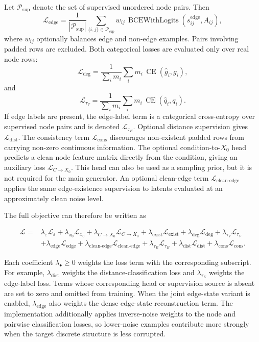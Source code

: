 Let $\mathcal{P}_{\mathrm{sup}}$ denote the set of supervised unordered node
pairs. Then
\[
\mathcal{L}_{\mathrm{edge}}
=
\frac{1}{|\mathcal{P}_{\mathrm{sup}}|}
\sum_{\{i,j\}\in\mathcal{P}_{\mathrm{sup}}}
w_{ij}\,
\operatorname{BCEWithLogits}
\left(
s^{\mathrm{edge}}_{ij},
A_{ij}
\right),
\]
where $w_{ij}$ optionally balances edge and non-edge examples. Pairs involving
padded rows are excluded.
Both categorical losses are evaluated only over real node rows:
\[
\mathcal{L}_{\mathrm{deg}}
=
\frac{1}{\sum_i m_i}
\sum_i
m_i\,
\operatorname{CE}(\hat g_i,g_i),
\]
and
\[
\mathcal{L}_{\tau_V}
=
\frac{1}{\sum_i m_i}
\sum_i
m_i\,
\operatorname{CE}(\hat q_i,q_i).
\]
If edge labels are present, the edge-label term is a categorical
cross-entropy over supervised node pairs and is denoted
\(\mathcal{L}_{\tau_E}\). Optional distance supervision gives
\(\mathcal{L}_{\mathrm{dist}}\). The consistency term
\(\mathcal{L}_{\mathrm{cons}}\) discourages non-existent padded rows from
carrying non-zero continuous information. The optional condition-to-\(X_0\)
head predicts a clean node feature matrix directly from the condition, giving
an auxiliary loss \(\mathcal{L}_{C\rightarrow X_0}\). This head can also be used
as a sampling prior, but it is not required for the main generator. An optional
clean-edge term \(\mathcal{L}_{\mathrm{clean\text{-}edge}}\) applies the same
edge-existence supervision to latents evaluated at an approximately clean noise
level.

The full objective can therefore be written as

\[
\begin{aligned}
    \mathcal{L}
    ={}&
    \lambda_{\varepsilon}\mathcal{L}_{\varepsilon}
    + \lambda_{x_0}\mathcal{L}_{x_0}
    + \lambda_{C\rightarrow X_0}\mathcal{L}_{C\rightarrow X_0}
    + \lambda_{\mathrm{exist}}\mathcal{L}_{\mathrm{exist}}
    + \lambda_{\mathrm{deg}}\mathcal{L}_{\mathrm{deg}}
    + \lambda_{\tau_V}\mathcal{L}_{\tau_V}  \\
    &+
    \lambda_{\mathrm{edge}}\mathcal{L}_{\mathrm{edge}}
    + \lambda_{\mathrm{clean\text{-}edge}}\mathcal{L}_{\mathrm{clean\text{-}edge}}
    + \lambda_{\tau_E}\mathcal{L}_{\tau_E}
    + \lambda_{\mathrm{dist}}\mathcal{L}_{\mathrm{dist}}
    + \lambda_{\mathrm{cons}}\mathcal{L}_{\mathrm{cons}}.
\end{aligned}
\]

Each coefficient \(\lambda_{\bullet}\geq 0\) weights the loss term with the
corresponding subscript. For example, \(\lambda_{\mathrm{dist}}\) weights the
distance-classification loss and \(\lambda_{\tau_E}\) weights the edge-label
loss. Terms whose corresponding head or supervision source is absent are set to
zero and omitted from training. When the joint edge-state variant is enabled,
\(\lambda_{\mathrm{edge}}\) also weights the dense edge-state reconstruction
term. The implementation additionally applies inverse-noise weights to the node
and pairwise classification losses, so lower-noise examples contribute more
strongly when the target discrete structure is less corrupted.

